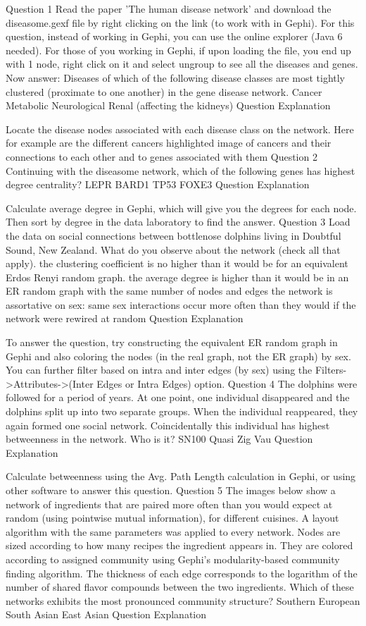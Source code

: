 Question 1
Read the paper 'The human disease network' and download the diseasome.gexf file by right clicking on the link (to work with in Gephi). For this question, instead of working in Gephi, you can use the online explorer (Java 6 needed). For those of you working in Gephi, if upon loading the file, you end up with 1 node, right click on it and select ungroup to see all the diseases and genes. Now answer: Diseases of which of the following disease classes are most tightly clustered (proximate to one another) in the gene disease network.
Cancer
Metabolic
Neurological
Renal (affecting the kidneys)
Question Explanation

Locate the disease nodes associated with each disease class on the network. Here for example are the different cancers highlighted image of cancers and their connections to each other and to genes associated with them
Question 2
Continuing with the diseasome network, which of the following genes has highest degree centrality?
LEPR
BARD1
TP53
FOXE3
Question Explanation

Calculate average degree in Gephi, which will give you the degrees for each node. Then sort by degree in the data laboratory to find the answer.
Question 3
Load the data on social connections between bottlenose dolphins living in Doubtful Sound, New Zealand. What do you observe about the network (check all that apply).
the clustering coefficient is no higher than it would be for an equivalent Erdos Renyi random graph.
the average degree is higher than it would be in an ER random graph with the same number of nodes and edges
the network is assortative on sex: same sex interactions occur more often than they would if the network were rewired at random
Question Explanation

To answer the question, try constructing the equivalent ER random graph in Gephi and also coloring the nodes (in the real graph, not the ER graph) by sex. You can further filter based on intra and inter edges (by sex) using the Filters->Attributes->(Inter Edges or Intra Edges) option.
Question 4
The dolphins were followed for a period of years. At one point, one individual disappeared and the dolphins split up into two separate groups. When the individual reappeared, they again formed one social network. Coincidentally this individual has highest betweenness in the network. Who is it?
SN100
Quasi
Zig
Vau
Question Explanation

Calculate betweenness using the Avg. Path Length calculation in Gephi, or using other software to answer this question.
Question 5
The images below show a network of ingredients that are paired more often than you would expect at random (using pointwise mutual information), for different cuisines. A layout algorithm with the same parameters was applied to every network. Nodes are sized according to how many recipes the ingredient appears in. They are colored according to assigned community using Gephi's modularity-based community finding algorithm. The thickness of each edge corresponds to the logarithm of the number of shared flavor compounds between the two ingredients. Which of these networks exhibits the most pronounced community structure?
Southern European 
South Asian 
East Asian 
Question Explanation


